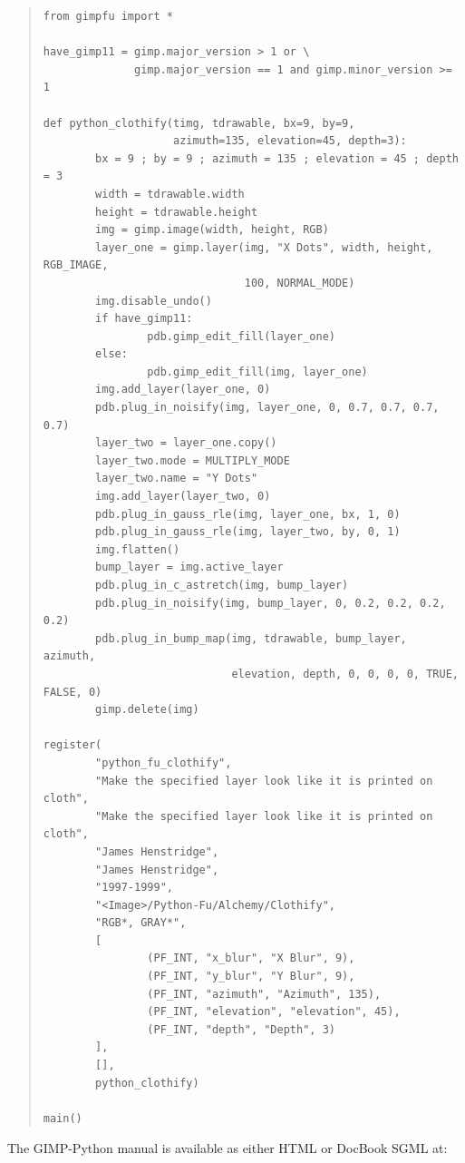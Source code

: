 \documentclass[twoside,11pt]{article}
\begin{document}
\small
\begin{quote}
\begin{verbatim}
from gimpfu import *

have_gimp11 = gimp.major_version > 1 or \
              gimp.major_version == 1 and gimp.minor_version >= 1

def python_clothify(timg, tdrawable, bx=9, by=9,
                    azimuth=135, elevation=45, depth=3):
        bx = 9 ; by = 9 ; azimuth = 135 ; elevation = 45 ; depth = 3
        width = tdrawable.width
        height = tdrawable.height
        img = gimp.image(width, height, RGB)
        layer_one = gimp.layer(img, "X Dots", width, height, RGB_IMAGE,
                               100, NORMAL_MODE)
        img.disable_undo()
        if have_gimp11:
                pdb.gimp_edit_fill(layer_one)
        else:
                pdb.gimp_edit_fill(img, layer_one)
        img.add_layer(layer_one, 0)
        pdb.plug_in_noisify(img, layer_one, 0, 0.7, 0.7, 0.7, 0.7)
        layer_two = layer_one.copy()
        layer_two.mode = MULTIPLY_MODE
        layer_two.name = "Y Dots"
        img.add_layer(layer_two, 0)
        pdb.plug_in_gauss_rle(img, layer_one, bx, 1, 0)
        pdb.plug_in_gauss_rle(img, layer_two, by, 0, 1)
        img.flatten()
        bump_layer = img.active_layer
        pdb.plug_in_c_astretch(img, bump_layer)
        pdb.plug_in_noisify(img, bump_layer, 0, 0.2, 0.2, 0.2, 0.2)
        pdb.plug_in_bump_map(img, tdrawable, bump_layer, azimuth,
                             elevation, depth, 0, 0, 0, 0, TRUE, FALSE, 0)
        gimp.delete(img)

register(
        "python_fu_clothify",
        "Make the specified layer look like it is printed on cloth",
        "Make the specified layer look like it is printed on cloth",
        "James Henstridge",
        "James Henstridge",
        "1997-1999",
        "<Image>/Python-Fu/Alchemy/Clothify",
        "RGB*, GRAY*",
        [
                (PF_INT, "x_blur", "X Blur", 9),
                (PF_INT, "y_blur", "Y Blur", 9),
                (PF_INT, "azimuth", "Azimuth", 135),
                (PF_INT, "elevation", "elevation", 45),
                (PF_INT, "depth", "Depth", 3)
        ],
        [],
        python_clothify)

main()
\end{verbatim}
\end{quote}
\normalsize

The GIMP-Python manual is available as either HTML or DocBook SGML at:
\end{document}
